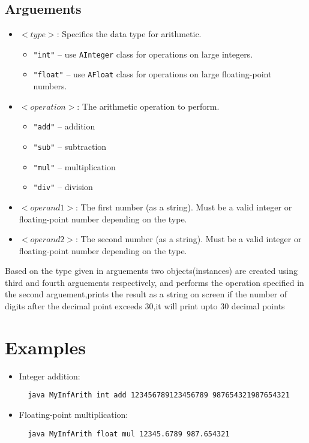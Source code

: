 \documentclass{article}
\begin{document}
\subsection*{Arguements}


\begin{itemize}
  \item \textbf{$<type>$}: Specifies the data type for arithmetic.
  \begin{itemize}
    \item \texttt{"int"} – use \texttt{AInteger} class for operations on large integers.
    \item \texttt{"float"} – use \texttt{AFloat} class for operations on large floating-point numbers.
  \end{itemize}

  \item \textbf{$<operation>$}: The arithmetic operation to perform.
  \begin{itemize}
    \item \texttt{"add"} – addition
    \item \texttt{"sub"} – subtraction
    \item \texttt{"mul"} – multiplication
    \item \texttt{"div"} – division
  \end{itemize}

  \item \textbf{$<operand1>$}: The first number (as a string). Must be a valid integer or floating-point number depending on the type.

  \item \textbf{$<operand2>$}: The second number (as a string). Must be a valid integer or floating-point number depending on the type.
\end{itemize}



Based on the type given in arguements two objects(instances) are created using third and fourth arguements respectively, and performs the operation specified in the second arguement,prints the result as a string on screen if the number of digits after the decimal point exceeds 30,it will print upto 30 decimal points
\newline




\section*{Examples}

\begin{itemize}
  \item Integer addition:
  \begin{verbatim}
  java MyInfArith int add 123456789123456789 987654321987654321
  \end{verbatim}

  \item Floating-point multiplication:
  \begin{verbatim}
  java MyInfArith float mul 12345.6789 987.654321
  \end{verbatim}
\end{itemize}
\end{document}
